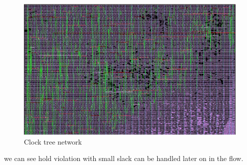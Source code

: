 \documentclass[../main.tex]{subfiles}
\begin{document}
\begin{figure}[h]
    \centering
    \includegraphics[width=13cm]{diagrams/ctsnetwork.JPG}
    \caption{Clock tree network}
    \label{fig:clknetwork}
\end{figure}
we can see hold violation with small slack can be handled later on in the flow.\\
\end{document}
